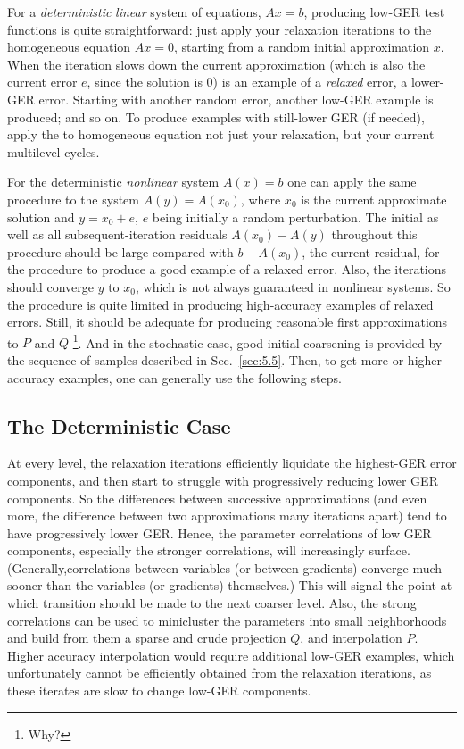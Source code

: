\documentclass{article} %
\begin{document}
For a {\it deterministic} {\it linear} system of equations, $Ax = b$, producing low-GER test functions is quite straightforward: just apply your relaxation iterations to the homogeneous equation $Ax = 0$, starting from a random initial approximation $x$. When the iteration slows down the current approximation (which is also the current error $e$, since the solution is $0$) is an example of a {\it relaxed} error, a lower-GER error. Starting with another random error, another low-GER example is produced; and so on. To produce examples with still-lower GER (if needed), apply the to homogeneous equation not just your relaxation, but your current multilevel cycles.

For the deterministic {\it nonlinear} system $A(x) = b$ one can apply the same procedure to the system $A(y) = A(x_0)$, where $x_0$ is the current approximate solution and $y = x_0 + e$, $e$ being initially a random perturbation. The initial as well as all subsequent-iteration residuals $A(x_0) - A(y)$  throughout this procedure should be large compared with $b - A(x_0)$, the current residual, for the procedure to produce a good example of a relaxed error. Also, the iterations should converge $y$ to $x_0$, which is not always guaranteed in nonlinear systems. So the procedure is quite limited in producing high-accuracy examples of relaxed errors. Still, it should be adequate for producing reasonable first approximations to $P$ and $Q$ \footnote{Why?}. And in the stochastic case, good initial coarsening is provided by the sequence of samples described in Sec.~\ref{sec:5.5}. Then, to get more or higher-accuracy examples, one can generally use the following steps.

\subsection{The Deterministic Case}
At every level, the relaxation iterations efficiently liquidate the highest-GER error components, and then start to struggle with progressively reducing lower GER components. So the differences between successive approximations (and even more, the difference between two approximations many iterations apart) tend to have progressively lower GER. Hence, the parameter correlations of low GER components, especially the stronger correlations, will increasingly surface. (Generally,correlations between variables (or between gradients) converge much sooner than the variables (or gradients) themselves.) This will signal the point at which transition should be made to the next coarser level. Also, the strong correlations can be used to minicluster the parameters into small neighborhoods and build from them a sparse and crude projection $Q$, and interpolation $P$. Higher accuracy interpolation would require additional low-GER examples, which unfortunately cannot be efficiently obtained from the relaxation iterations, as these iterates are slow to change low-GER components.
\end{document}

